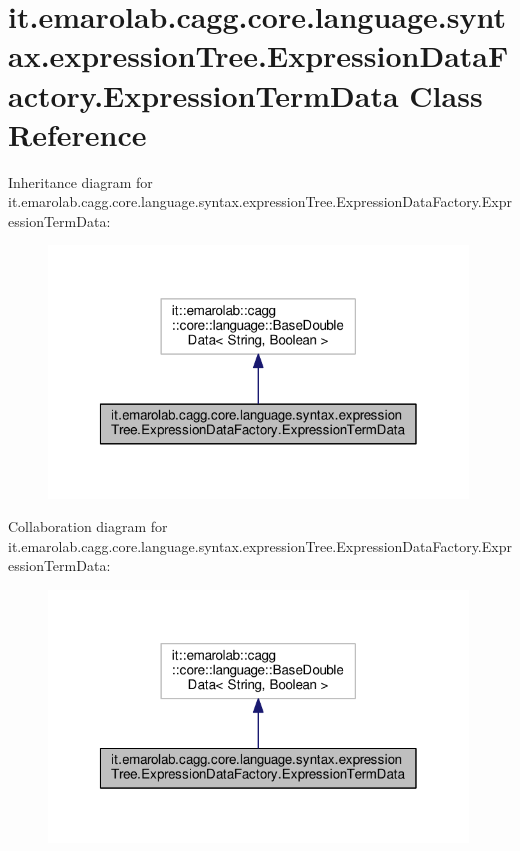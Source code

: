 \hypertarget{classit_1_1emarolab_1_1cagg_1_1core_1_1language_1_1syntax_1_1expressionTree_1_1ExpressionDataFactory_1_1ExpressionTermData}{\section{it.\-emarolab.\-cagg.\-core.\-language.\-syntax.\-expression\-Tree.\-Expression\-Data\-Factory.\-Expression\-Term\-Data Class Reference}
\label{classit_1_1emarolab_1_1cagg_1_1core_1_1language_1_1syntax_1_1expressionTree_1_1ExpressionDataFactory_1_1ExpressionTermData}
}


Inheritance diagram for it.\-emarolab.\-cagg.\-core.\-language.\-syntax.\-expression\-Tree.\-Expression\-Data\-Factory.\-Expression\-Term\-Data\-:\nopagebreak
\begin{figure}[H]
\begin{center}
\leavevmode
\includegraphics[width=316pt]{classit_1_1emarolab_1_1cagg_1_1core_1_1language_1_1syntax_1_1expressionTree_1_1ExpressionDataFac4a5c394c22dd771a3025b6c09735658b}
\end{center}
\end{figure}


Collaboration diagram for it.\-emarolab.\-cagg.\-core.\-language.\-syntax.\-expression\-Tree.\-Expression\-Data\-Factory.\-Expression\-Term\-Data\-:\nopagebreak
\begin{figure}[H]
\begin{center}
\leavevmode
\includegraphics[width=316pt]{classit_1_1emarolab_1_1cagg_1_1core_1_1language_1_1syntax_1_1expressionTree_1_1ExpressionDataFac05514e31020c92c66bbed9d27c104c5f}
\end{center}
\end{figure}
